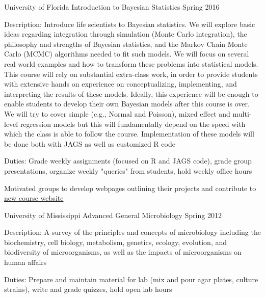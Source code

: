 \begin{cventries}
  \cventry
    {University of Florida} %
    {Introduction to Bayesian Statistics} %
    {} %
    {Spring 2016} %
    {
      \begin{cvitems} %
        \item {Description: Introduce life scientists to Bayesian statistics. We will explore basic ideas regarding integration through simulation (Monte Carlo integration), the philosophy and strengths of Bayesian statistics, and the Markov Chain Monte Carlo (MCMC) algorithms needed to fit such models. We will focus on several real world examples and how to transform these problems into statistical models. This course will rely on substantial extra-class work, in order to provide students with extensive hands on experience on conceptualizing, implementing, and interpreting the results of these models. Ideally, this experience will be enough to enable students to develop their own Bayesian models after this course is over. We will try to cover simple (e.g., Normal and Poisson), mixed effect and multi-level regression models but this will fundamentally depend on the speed with which the class is able to follow the course. Implementation of these models will be done both with JAGS as well as customized R code}
        \item {Duties: Grade weekly assignments (focused on R and JAGS code), grade group presentations, organize weekly "queries" from students, hold weekly office hours}
        \item {Motivated groups to develop webpages outlining their projects and contribute to \href{http://bayescourse.updog.co/}{new course website}}
      \end{cvitems}
    }

  \cventry
    {University of Mississippi} %
    {Advanced General Microbiology} %
    {} %
    {Spring 2012} %
    {
      \begin{cvitems} %
        \item {Description: A survey of the principles and concepts of microbiology including the biochemistry, cell biology, metabolism, genetics, ecology, evolution, and biodiversity of microorganisms, as well as the impacts of microorganisms on human affairs}
        \item {Duties: Prepare and maintain material for lab (mix and pour agar plates, culture strains), write and grade quizzes, hold open lab hours}
      \end{cvitems}
    }


\end{cventries}
